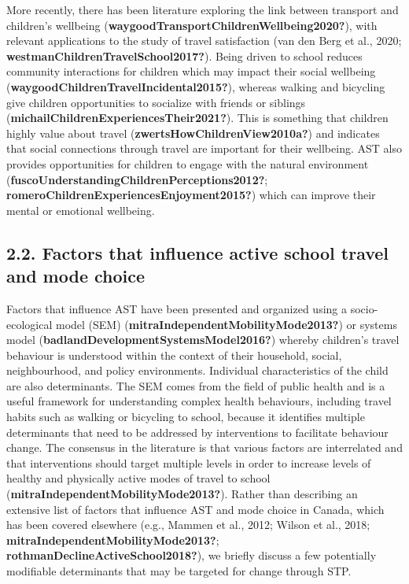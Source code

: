 \documentclass[]{elsarticle} %
\begin{document}
More recently, there has been literature exploring the link between
transport and children's wellbeing
(\textbf{waygoodTransportChildrenWellbeing2020?}), with relevant
applications to the study of travel satisfaction (van den Berg et al.,
2020; \textbf{westmanChildrenTravelSchool2017?}). Being driven to school
reduces community interactions for children which may impact their
social wellbeing (\textbf{waygoodChildrenTravelIncidental2015?}),
whereas walking and bicycling give children opportunities to socialize
with friends or siblings
(\textbf{michailChildrenExperiencesTheir2021?}). This is something that
children highly value about travel
(\textbf{zwertsHowChildrenView2010a?}) and indicates that social
connections through travel are important for their wellbeing. AST also
provides opportunities for children to engage with the natural
environment (\textbf{fuscoUnderstandingChildrenPerceptions2012?};
\textbf{romeroChildrenExperiencesEnjoyment2015?}) which can improve
their mental or emotional wellbeing.

\hypertarget{factors-that-influence-active-school-travel-and-mode-choice}{%
\subsection{2.2. Factors that influence active school travel and mode
choice}\label{factors-that-influence-active-school-travel-and-mode-choice}}

Factors that influence AST have been presented and organized using a
socio-ecological model (SEM)
(\textbf{mitraIndependentMobilityMode2013?}) or systems model
(\textbf{badlandDevelopmentSystemsModel2016?}) whereby children's travel
behaviour is understood within the context of their household, social,
neighbourhood, and policy environments. Individual characteristics of
the child are also determinants. The SEM comes from the field of public
health and is a useful framework for understanding complex health
behaviours, including travel habits such as walking or bicycling to
school, because it identifies multiple determinants that need to be
addressed by interventions to facilitate behaviour change. The consensus
in the literature is that various factors are interrelated and that
interventions should target multiple levels in order to increase levels
of healthy and physically active modes of travel to school
(\textbf{mitraIndependentMobilityMode2013?}). Rather than describing an
extensive list of factors that influence AST and mode choice in Canada,
which has been covered elsewhere (e.g., Mammen et al., 2012; Wilson et
al., 2018; \textbf{mitraIndependentMobilityMode2013?};
\textbf{rothmanDeclineActiveSchool2018?}), we briefly discuss a few
potentially modifiable determinants that may be targeted for change
through STP.
\end{document}
